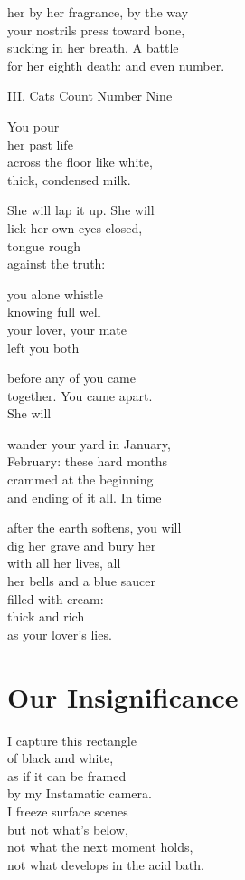\documentclass[twoside,10pt]{book}
\begin{document}
her by her fragrance, by the way\\
your nostrils press toward bone,\\
sucking in her breath. A battle\\
for her eighth death: and even number.

III. Cats Count Number Nine

You pour\\
her past life\\
across the floor like white,\\
thick, condensed milk.

She will lap it up. She will\\
lick her own eyes closed,\\
tongue rough\\
against the truth:

you alone whistle\\
knowing full well\\
your lover, your mate\\
left you both

before any of you came\\
together. You came apart.\\
She will

wander your yard in January,\\
February: these hard months\\
crammed at the beginning\\
and ending of it all. In time

after the earth softens, you will\\
dig her grave and bury her\\
with all her lives, all\\
her bells and a blue saucer\\
filled with cream:\\
thick and rich\\
as your lover's lies.


\clearpage
\section{Our Insignificance}

I capture this rectangle\\
of black and white,\\
as if it can be framed\\
by my Instamatic camera.\\
I freeze surface scenes\\
but not what's below,\\
not what the next moment holds,\\
not what develops in the acid bath.
\end{document}
